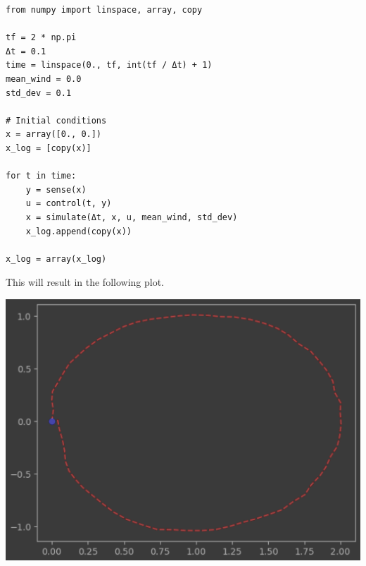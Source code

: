 \documentclass[letterpaper, 10 pt, conference]{ieeeconf}  %
\begin{document}
    \begin{lstlisting}[label={lst:lstlistin9}]
from numpy import linspace, array, copy

tf = 2 * np.pi
Δt = 0.1
time = linspace(0., tf, int(tf / Δt) + 1)
mean_wind = 0.0
std_dev = 0.1

# Initial conditions
x = array([0., 0.])
x_log = [copy(x)]

for t in time:
    y = sense(x)
    u = control(t, y)
    x = simulate(Δt, x, u, mean_wind, std_dev)
    x_log.append(copy(x))

x_log = array(x_log)
    \end{lstlisting}
    This will result in the following plot.
    \begin{center}
        \includegraphics[scale=0.4]{exercise-4-2}
    \end{center}

%
\end{document}
